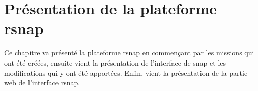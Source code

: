 \chapter{Présentation de la plateforme \gls{rsnap}}
Ce chapitre va présenté la plateforme \gls{rsnap} en commençant par les missions qui ont été créées, ensuite vient la présentation de l'interface de \gls{snap} et les modifications qui y ont été apportées. Enfin, vient la présentation de la partie web de l'interface \gls{rsnap}.



